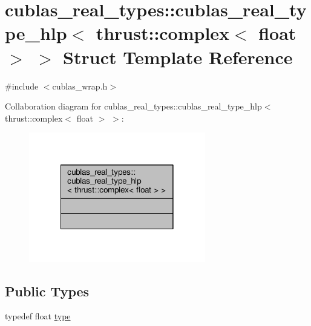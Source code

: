 \hypertarget{structcublas__real__types_1_1cublas__real__type__hlp_3_01thrust_1_1complex_3_01float_01_4_01_4}{\section{cublas\-\_\-real\-\_\-types\-:\-:cublas\-\_\-real\-\_\-type\-\_\-hlp$<$ thrust\-:\-:complex$<$ float $>$ $>$ Struct Template Reference}
\label{structcublas__real__types_1_1cublas__real__type__hlp_3_01thrust_1_1complex_3_01float_01_4_01_4}
}


{\ttfamily \#include $<$cublas\-\_\-wrap.\-h$>$}



Collaboration diagram for cublas\-\_\-real\-\_\-types\-:\-:cublas\-\_\-real\-\_\-type\-\_\-hlp$<$ thrust\-:\-:complex$<$ float $>$ $>$\-:\nopagebreak
\begin{figure}[H]
\begin{center}
\leavevmode
\includegraphics[width=218pt]{structcublas__real__types_1_1cublas__real__type__hlp_3_01thrust_1_1complex_3_01float_01_4_01_4__coll__graph}
\end{center}
\end{figure}
\subsection*{Public Types}
\begin{DoxyCompactItemize}
\item 
typedef float \hyperlink{structcublas__real__types_1_1cublas__real__type__hlp_3_01thrust_1_1complex_3_01float_01_4_01_4_a4df7173816b8077f524b4eabfafdc50d}{type}
\end{DoxyCompactItemize}


